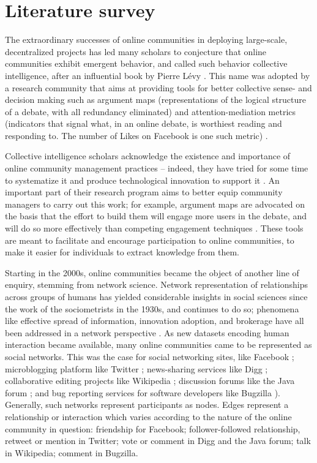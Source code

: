 \section{Literature survey}

The extraordinary successes of online communities in deploying large-scale, decentralized projects has led many scholars to conjecture that online communities exhibit emergent behavior, and called such behavior collective intelligence, after an influential book by Pierre L\'evy \cite{pierre1997collective}. This name was adopted by a research community that aims at providing tools for better collective sense- and decision making such as argument maps (representations of the logical structure of a debate, with all redundancy eliminated) \cite{shum2003roots} and attention-mediation metrics (indicators that signal what, in an online debate, is worthiest reading and responding to. The number of Likes on Facebook is one such metric) \cite{klein2012enabling}. 

Collective intelligence scholars acknowledge the existence and importance of online community management practices – indeed, they have tried for some time to systematize it \cite{blondel2008fast, diplaris2011emerging} and produce technological innovation to support it \cite{de2012contested}. An important part of their research program aims to better equip community managers to carry out this work; for example, argument maps are advocated on the basis that the effort to build them will engage more users in the debate, and will do so more effectively than competing engagement techniques \cite{shum2003roots}. These tools are meant to facilitate and encourage participation to online communities, to make it easier for individuals to extract knowledge from them.

Starting in the 2000s, online communities became the object of another line of enquiry, stemming from network science. Network representation of relationships across groups of humans has yielded considerable insights in social sciences since the work of the sociometrists in the 1930s, and continues to do so; phenomena like effective spread of information, innovation adoption, and brokerage have all been addressed in a network perspective \cite{borgatti2009network, burt2009structural}. As new datasets encoding human interaction became available, many online communities came to be represented as social networks. This was the case for social networking sites, like Facebook \cite{lewis2008tastes, nick2013toward}; microblogging platform like Twitter \cite{kunegis2013preferential, java2007we, hodas2014simple}; news-sharing services like Digg \cite{hodas2014simple}; collaborative editing projects like Wikipedia \cite{laniado2011wikipedians}; discussion forums like the Java forum \cite{zhang2007expertise}; and bug reporting services for software developers like Bugzilla \cite{zanetti2012quantitative}). Generally, such networks represent participants as nodes. Edges represent a relationship or interaction which varies according to the nature of the online community in question: friendship for Facebook; follower-followed relationship, retweet or mention in Twitter; vote or comment in Digg and the Java forum; talk in Wikipedia; comment in Bugzilla. 

